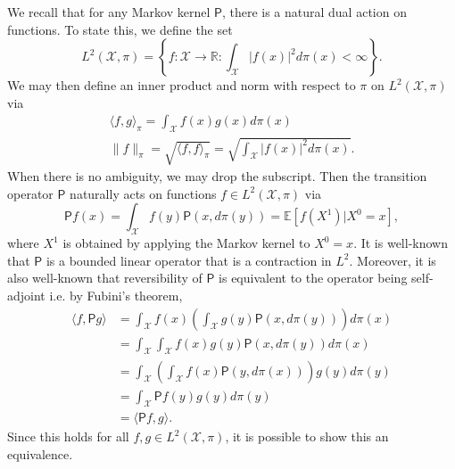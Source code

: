 \documentclass[11pt]{article}
\begin{document}
We recall that for any Markov kernel $\mathsf{P}$, there is a natural dual action on functions. To state this, we define the set
\begin{equation*}
    L^2(\mathcal{X},\pi) = \left\{f:\mathcal{X}\to \mathbb{R}: \int_{\mathcal{X}} \vert f(x)\vert^2d\pi(x)<\infty\right\}.
\end{equation*}
We may then define an inner product and norm with respect to $\pi$ on $L^2(\mathcal{X},\pi)$ via
\begin{gather*}
    \langle f,g\rangle_{\pi} = \int_{\mathcal{X}} f(x)g(x)d\pi(x)\\
    \|f\|_{\pi} = \sqrt{\langle f,f\rangle_{\pi}} = \sqrt{\int_{\mathcal{X}} \vert f(x)\vert^2d\pi(x)}.
\end{gather*}
When there is no ambiguity, we may drop the subscript. Then the transition operator $\mathsf{P}$ naturally acts on functions $f\in L^2(\mathcal{X},\pi)$ via
\begin{equation*}
    \mathsf{P}f(x) = \int_{\mathcal{X}} f(y)\mathsf{P}(x,d\pi(y)) = \mathbb{E}[f(X^1)\vert X^0 = x],
\end{equation*}
where $X^1$ is obtained by applying the Markov kernel to $X^0=x$.
It is well-known that $\mathsf{P}$ is a bounded linear operator that is a contraction in $L^2$. Moreover, it is also well-known that reversibility of $\mathsf{P}$ is equivalent to the operator being self-adjoint i.e. by Fubini's theorem,
\begin{align*}
    \langle f,\mathsf{P}g\rangle &= \int_{\mathcal{X}} f(x)\left(\int_{\mathcal{X}} g(y)\mathsf{P}(x,d\pi(y))\right)d\pi(x)\\
    &=\int_{\mathcal{X}}\int_{\mathcal{X}} f(x)g(y) \mathsf{P}(x,d\pi(y))d\pi(x)\\
    &=  \int_{\mathcal{X}} \left(\int_{\mathcal{X}} f(x)\mathsf{P}(y,d\pi(x))\right) g(y)d\pi(y)\\
    &=\int_{\mathcal{X}} \mathsf{P}f(y) g(y)d\pi(y)\\
    &=\langle \mathsf{P}f,g\rangle.
\end{align*}
Since this holds for all $f,g\in L^2(\mathcal{X},\pi)$, it is possible to show this an equivalence.
\end{document}

